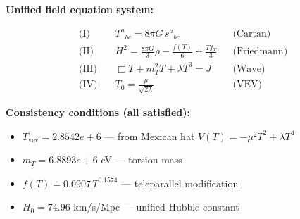 
\textbf{Unified field equation system:}

\begin{align}
  \text{(I)} \quad & T^a{}_{bc} = 8\pi G \, s^a{}_{bc} && \text{(Cartan)} \\
  \text{(II)} \quad & H^2 = \frac{8\pi G}{3}\rho - \frac{f(T)}{6} + \frac{Tf_T}{3} && \text{(Friedmann)} \\
  \text{(III)} \quad & \Box T + m_T^2 T + \lambda T^3 = J && \text{(Wave)} \\
  \text{(IV)} \quad & T_0 = \frac{\mu}{\sqrt{2\lambda}} && \text{(VEV)}
\end{align}

\textbf{Consistency conditions (all satisfied):}
\begin{itemize}
  \item $T_{\text{vev}} = 2.8542e+6$ — from Mexican hat $V(T) = -\mu^2 T^2 + \lambda T^4$
  \item $m_T = 6.8893e+6$ eV — torsion mass
  \item $f(T) = 0.0907 \, T^{0.1574}$ — teleparallel modification
  \item $H_0 = 74.96$ km/s/Mpc — unified Hubble constant
\end{itemize}